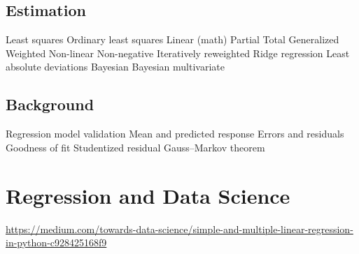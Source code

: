\documentclass[11pt,a4paper]{article}
\begin{document}
\subsection{Estimation}
Least squares Ordinary least squares Linear (math) Partial Total Generalized Weighted Non-linear Non-negative Iteratively reweighted Ridge regression
Least absolute deviations Bayesian Bayesian multivariate

\subsection{Background}
Regression model validation Mean and predicted response Errors and residuals Goodness of fit Studentized residual Gauss–Markov theorem


\section{Regression and Data Science}
{\href {https://medium.com/towards-data-science/simple-and-multiple-linear-regression-in-python-c928425168f9}
{https://medium.com/towards-data-science/simple-and-multiple-linear-regression-in-python-c928425168f9}
}
\end{document}
